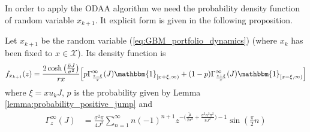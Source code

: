 In order to apply the \gls{ODAA} algorithm we need the probability density function of random variable $x_{k+1}$. It explicit form is given in the following proposition.
\begin{proposition}
	Let $x_{k+1}$ be the random variable (\ref{eq:GBM_portfolio_dynamics}) (where $x_k$ has been fixed to $x \in \mathcal{X}$). Its density function is
	\begin{equation}
	f_{x_{k+1}}(z) = \frac{2\cosh\big(\frac{\tilde{\mu}J}{\sigma^2}\big)}{rx}\Big[p \Gamma^\infty_{\frac{z-\xi}{x}}(J) \mathbbm{1}_{[x+\xi,\infty)} + (1-p)\Gamma^\infty_{\frac{z+\xi}{x}}(J) \mathbbm{1}_{[x-\xi,\infty)}  \Big]
	\end{equation}
	where $\xi = xu_kJ$, $p$ is the probability given by Lemma \ref{lemma:probability_positive_jump} and
	\begin{align*}
	\Gamma^\infty_{z}(J) &=\frac{\sigma^2\pi}{4J^2}\sum_{n=1}^{\infty}n(-1)^{n+1}z^{-\big(\frac{\tilde{\mu}}{2\sigma^2} + \frac{\sigma^2n^2\pi^2}{8J^2}\big)-1}\sin(\frac{\pi}{2}n)
	\end{align*}
\end{proposition}
